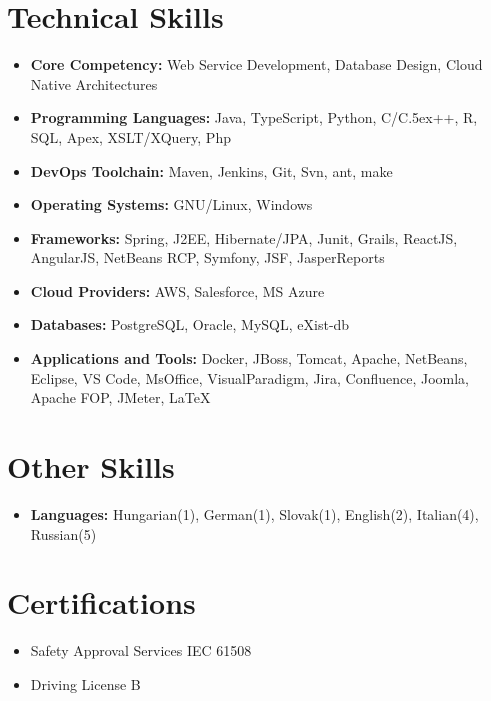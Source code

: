 \documentclass[letterpaper,11pt]{article}
\def\Cplusplus{{\rm C\raise.5ex\hbox{\tiny ++}}}
\begin{document}
\section{\bf Technical Skills}
\begin{itemize}
       \setlength{\leftmargini}{0.5cm}    %
        \setlength{\itemsep}{0.2em}       %
        \setlength{\topsep}{5pt}         %
        \setlength{\partopsep}{10pt}      %
\item \textbf{Core Competency:} Web Service Development, Database Design, Cloud Native Architectures
\item \textbf{Programming Languages:} Java, TypeScript, Python, C/\Cplusplus, R, SQL, Apex, XSLT/XQuery, Php
\item \textbf{DevOps Toolchain:} Maven, Jenkins, Git, Svn, ant, make
\item \textbf{Operating Systems:} GNU/Linux, Windows
\item \textbf{Frameworks:} Spring, J2EE, Hibernate/JPA, Junit, Grails, ReactJS, AngularJS, NetBeans RCP, Symfony, JSF, JasperReports
\item \textbf{Cloud Providers:} AWS, Salesforce, MS Azure
\item \textbf{Databases:} PostgreSQL, Oracle, MySQL, eXist-db 
\item \textbf{Applications and Tools:} Docker, JBoss, Tomcat, Apache, NetBeans, Eclipse, VS Code, MsOffice, VisualParadigm, Jira, Confluence, Joomla, Apache FOP, JMeter, \LaTeX
\end{itemize}

\section{\bf Other Skills}
\begin{itemize}
\item \textbf{Languages:} Hungarian(1), German(1), Slovak(1), English(2), Italian(4), Russian(5)
\end{itemize}

\section{\bf Certifications}
\begin{itemize}
\item Safety Approval Services IEC 61508
\item Driving License B
\end{itemize}
\end{document}

